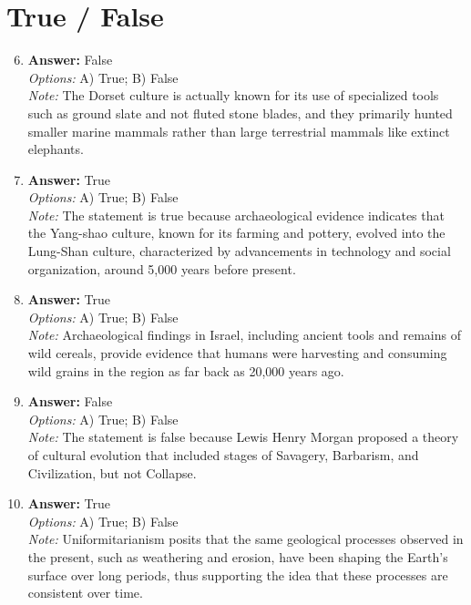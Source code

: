 \documentclass[12pt]{article}
\begin{document}
\section*{True / False}
\begin{enumerate}[label=\arabic*.]
\setcounter{enumi}{5}
\item \textbf{Answer:} False
\\ \textit{Options:} A) True; B) False
\\ \textit{Note:} The Dorset culture is actually known for its use of specialized tools such as ground slate and not fluted stone blades, and they primarily hunted smaller marine mammals rather than large terrestrial mammals like extinct elephants.
\item \textbf{Answer:} True
\\ \textit{Options:} A) True; B) False
\\ \textit{Note:} The statement is true because archaeological evidence indicates that the Yang-shao culture, known for its farming and pottery, evolved into the Lung-Shan culture, characterized by advancements in technology and social organization, around 5,000 years before present.
\item \textbf{Answer:} True
\\ \textit{Options:} A) True; B) False
\\ \textit{Note:} Archaeological findings in Israel, including ancient tools and remains of wild cereals, provide evidence that humans were harvesting and consuming wild grains in the region as far back as 20,000 years ago.
\item \textbf{Answer:} False
\\ \textit{Options:} A) True; B) False
\\ \textit{Note:} The statement is false because Lewis Henry Morgan proposed a theory of cultural evolution that included stages of Savagery, Barbarism, and Civilization, but not Collapse.
\item \textbf{Answer:} True
\\ \textit{Options:} A) True; B) False
\\ \textit{Note:} Uniformitarianism posits that the same geological processes observed in the present, such as weathering and erosion, have been shaping the Earth's surface over long periods, thus supporting the idea that these processes are consistent over time.
\end{enumerate}
\end{document}
